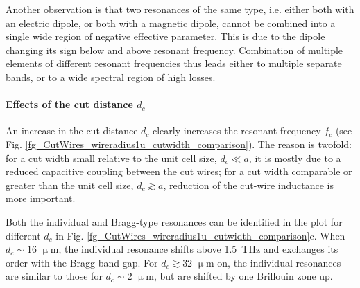 Another observation is that two resonances of the same type, i.e. either both with an electric dipole, or both with a magnetic dipole, cannot be combined into a single wide region of negative effective parameter. This is due to the dipole changing its sign below and above resonant frequency. Combination of multiple elements of different resonant frequencies thus leads either to multiple separate bands, or to a wide spectral region of high losses.


\paragraph{Effects of the cut distance $d_c$}%
An increase in the cut distance $d_c$ clearly increases the resonant frequency $f_c$ (see Fig. \ref{fg_CutWires_wireradius1u_cutwidth_comparison}). The reason is twofold: for a cut width small relative to the unit cell size, $d_c\ll a$, it is mostly due to a reduced capacitive coupling between the cut wires; for a cut width comparable or greater than the unit cell size, $d_c \gtrsim a$, reduction of the cut-wire inductance is more important.

Both the individual and Bragg-type resonances can be identified in the plot for different $d_c$ in Fig. \ref{fg_CutWires_wireradius1u_cutwidth_comparison}c. When $d_c \sim 16$  $\upmu$m, the individual resonance shifts above 1.5~THz and exchanges its order with the Bragg band gap. 
For $d_c \gtrsim 32$  $\upmu$m on, the individual resonances are similar to those for $d_c\sim 2$ $\upmu$m, but are shifted by one Brillouin zone up.


